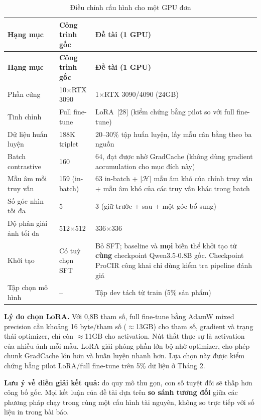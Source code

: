 \documentclass[a4paper]{article}
\begin{document}
\begin{longtable}{L{3.6cm}L{3.8cm}L{7.8cm}}
\caption{Điều chỉnh cấu hình cho một GPU đơn}\label{tab:config}\\
\toprule
\textbf{Hạng mục} & \textbf{Công trình gốc} & \textbf{Đề tài (1 GPU)}\\
\midrule\endfirsthead
\toprule
\textbf{Hạng mục} & \textbf{Công trình gốc} & \textbf{Đề tài (1 GPU)}\\
\midrule\endhead
Phần cứng & 10$\times$RTX 3090 & 1$\times$RTX 3090/4090 (24GB)\\
Tinh chỉnh & Full fine-tune & LoRA~[28] (kiểm chứng bằng pilot so với full fine-tune)\\
Dữ liệu huấn luyện & 188K triplet & 20--30\% tập huấn luyện, lấy mẫu cân bằng theo ba nguồn\\
Batch contrastive & 160 & 64, đạt được nhờ GradCache (không dùng gradient accumulation cho mục đích này)\\
Mẫu âm mỗi truy vấn & 159 (in-batch) & 63 in-batch + $|\mathcal{H}|$ mẫu âm khó của chính truy vấn + mẫu âm khó của các truy vấn khác trong batch\\
Số góc nhìn tối đa & 5 & 3 (giữ trước + sau + một góc bổ sung)\\
Độ phân giải ảnh tối đa & 512$\times$512 & 336$\times$336\\
Khởi tạo & Có tuỳ chọn SFT & Bỏ SFT; baseline và \textbf{mọi} biến thể khởi tạo từ \textbf{cùng} checkpoint Qwen3.5-0.8B gốc. Checkpoint ProCIR công khai chỉ dùng kiểm tra pipeline đánh giá\\
Tập chọn mô hình & -- & Tập dev tách từ train (5\% sản phẩm)\\
\bottomrule
\end{longtable}

\textbf{Lý do chọn LoRA.} Với 0,8B tham số, full fine-tune bằng AdamW mixed precision cần khoảng 16 byte/tham số ($\approx$13GB) cho tham số, gradient và trạng thái optimizer, chỉ còn $\approx$11GB cho activation. Nút thắt thực sự là activation của nhiều ảnh mỗi mẫu. LoRA giải phóng phần lớn bộ nhớ optimizer, cho phép chunk GradCache lớn hơn và huấn luyện nhanh hơn. Lựa chọn này được kiểm chứng bằng pilot LoRA/full fine-tune trên 5\% dữ liệu ở Tháng 2.

\textbf{Lưu ý về diễn giải kết quả:} do quy mô thu gọn, con số tuyệt đối sẽ thấp hơn công bố gốc. Mọi kết luận của đề tài dựa trên \textbf{so sánh tương đối} giữa các phương pháp chạy trong cùng một cấu hình tài nguyên, không so trực tiếp với số liệu in trong bài báo.
\end{document}
